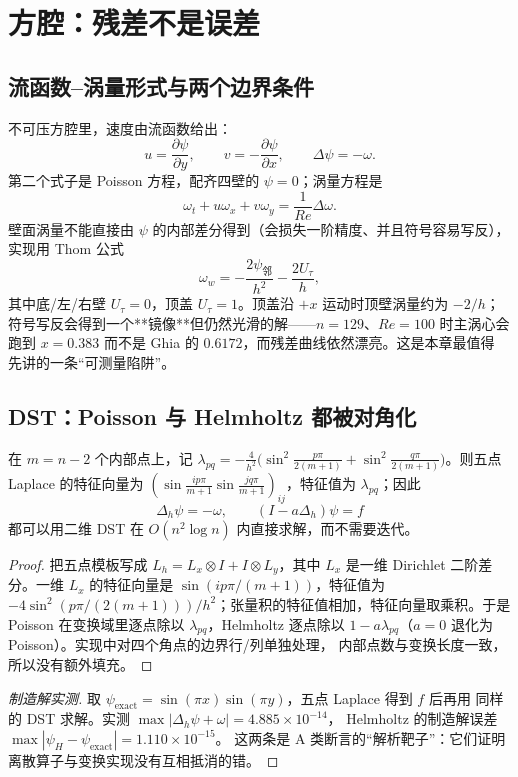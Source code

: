\section{方腔：残差不是误差}\label{sec:cavity}

\subsection{流函数--涡量形式与两个边界条件}

不可压方腔里，速度由流函数给出：
\[
  u=\frac{\partial\psi}{\partial y},\qquad
  v=-\frac{\partial\psi}{\partial x},\qquad
  \Delta\psi=-\omega .
\]
第二个式子是 Poisson 方程，配齐四壁的 $\psi=0$；涡量方程是
\[
  \omega_t+u\omega_x+v\omega_y=\frac1{Re}\Delta\omega .
\]
壁面涡量不能直接由 $\psi$ 的内部差分得到（会损失一阶精度、并且符号容易写反），
实现用 Thom 公式
\[
  \omega_w=-\frac{2\psi_{\text{邻}}}{h^2}-\frac{2U_\tau}{h},
\]
其中底/左/右壁 $U_\tau=0$，顶盖 $U_\tau=1$。顶盖沿 $+x$ 运动时顶壁涡量约为
$-2/h$；符号写反会得到一个**镜像**但仍然光滑的解——$n=129$、$Re=100$ 时主涡心会
跑到 $x=0.383$ 而不是 Ghia 的 $0.6172$，而残差曲线依然漂亮。这是本章最值得
先讲的一条“可测量陷阱”。

\subsection{DST：Poisson 与 Helmholtz 都被对角化}

\begin{theorem}\label{thm:dst}
在 $m=n-2$ 个内部点上，记
$\lambda_{pq}=-\frac{4}{h^2}\bigl(\sin^2\frac{p\pi}{2(m+1)}
+\sin^2\frac{q\pi}{2(m+1)}\bigr)$。则五点 Laplace 的特征向量为
$(\sin\frac{ip\pi}{m+1}\sin\frac{jq\pi}{m+1})_{ij}$，特征值为
$\lambda_{pq}$；因此
\[
  \Delta_h\psi=-\omega,\qquad (I-a\Delta_h)\psi=f
\]
都可以用二维 DST 在 $O(n^2\log n)$ 内直接求解，而不需要迭代。
\end{theorem}

\begin{proof}
把五点模板写成 $L_h=L_x\otimes I+I\otimes L_y$，其中 $L_x$ 是一维 Dirichlet
二阶差分。一维 $L_x$ 的特征向量是 $\sin(ip\pi/(m+1))$，特征值为
$-4\sin^2(p\pi/(2(m+1)))/h^2$；张量积的特征值相加，特征向量取乘积。于是
Poisson 在变换域里逐点除以 $\lambda_{pq}$，Helmholtz 逐点除以
$1-a\lambda_{pq}$（$a=0$ 退化为 Poisson）。实现中对四个角点的边界行/列单独处理，
内部点数与变换长度一致，所以没有额外填充。
\end{proof}

\begin{proof}[制造解实测]
取 $\psi_{\text{exact}}=\sin(\pi x)\sin(\pi y)$，五点 Laplace 得到 $f$ 后再用
同样的 DST 求解。实测 $\max|\Delta_h\psi+\omega|=4.885\times10^{-14}$，
Helmholtz 的制造解误差 $\max|\psi_H-\psi_{\text{exact}}|=1.110\times10^{-15}$。
这两条是 A 类断言的“解析靶子”：它们证明离散算子与变换实现没有互相抵消的错。
\end{proof}

